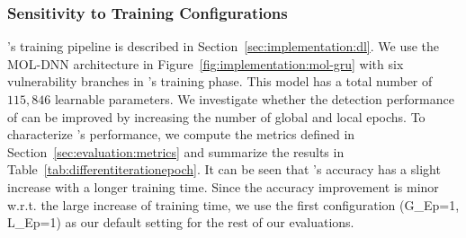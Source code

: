 \subsubsection{Sensitivity to Training Configurations}  
\sys{}'s training pipeline is described in Section~\ref{sec:implementation:dl}.
We use the MOL-DNN architecture in Figure~\ref{fig:implementation:mol-gru} with six vulnerability branches in \sys{}'s training phase. 
This model has a total number of $115,846$ learnable parameters.
We investigate whether the detection performance of \sys{} can be improved by increasing the number of global and local epochs.
To characterize \sys{}'s performance, we compute the metrics defined in Section~\ref{sec:evaluation:metrics} and summarize the results in Table~\ref{tab:differentiterationepoch}. 
It can be seen that \sys{}'s accuracy has a slight increase with a longer training time. Since the accuracy improvement is minor w.r.t. the large increase of training time, we use the first configuration (G\_{Ep}=1, L\_{Ep}=1) as our default setting for the rest of our evaluations.

